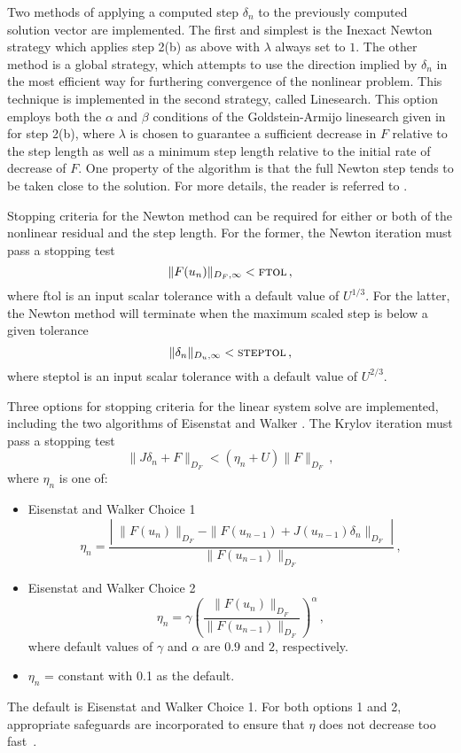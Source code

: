 Two methods of applying a computed step $\delta_n$ to the
previously computed solution vector are implemented. The first and
simplest is the Inexact Newton strategy which applies step 2(b) as
above with $\lambda$ always set to $1$. The other method is a
global strategy, which attempts to use the direction implied by
$\delta_n$ in the most efficient way for furthering convergence of
the nonlinear problem. This technique is implemented in the second
strategy, called Linesearch.  This option employs both the
$\alpha$ and $\beta$ conditions of the Goldstein-Armijo linesearch
given in \cite{DeSc:96} for step 2(b), where $\lambda$ is chosen
to guarantee a sufficient decrease in $F$ relative to the step
length as well as a minimum step length relative to the initial
rate of decrease of $F$.  One property of the algorithm is that
the full Newton step tends to be taken close to the solution.  For
more details, the reader is referred to \cite{DeSc:96}.

Stopping criteria for the Newton method can be required for either
or both of the nonlinear residual and the step length.  For the
former, the Newton iteration must pass a stopping test
\[ \|F(u_n)\|_{D_F,\infty} < \mbox{\sc ftol} \, , \]
where {\sc ftol} is an input scalar tolerance with a default value
of $U^{1/3}$. For the latter, the Newton method will terminate
when the maximum scaled step is below a given tolerance
\[ \|\delta_n\|_{D_u,\infty} < \mbox{\sc steptol} \, , \]
where {\sc steptol} is an input scalar tolerance with a default
value of $U^{2/3}$.

Three options for stopping criteria for the linear system solve
are implemented, including the two algorithms of Eisenstat and
Walker \cite{EiWa:96}. The Krylov iteration must pass a stopping
test
\[ \|J \delta_n + F\|_{D_F} < (\eta_n + U) \|F\|_{D_F} \, , \]
where $\eta_n$ is one of:
\begin{itemize}
\item Eisenstat and Walker Choice 1
  \[
  \eta_n = \frac{\left|\; \|F(u_n)\|_{D_F}
      - \|F(u_{n-1}) + J(u_{n-1}) \delta_n \|_{D_F}
      \; \right|}
  {\|F(u_{n-1})\|_{D_F}} \, ,
  \]
\item Eisenstat and Walker Choice 2
  \[
  \eta_n = \gamma
  \left( \frac{ \|F(u_n)\|_{D_F}}{\|F(u_{n-1})\|_{D_F}} \right)^{\alpha} \, ,
  \]
where default values of $\gamma$ and $\alpha$ are $0.9$ and $2$,
 respectively.
\item  $\eta_n$ = constant with 0.1 as the default.
\end{itemize}
The default is Eisenstat and Walker Choice 1. For both options 1
and 2, appropriate safeguards are incorporated to ensure that
$\eta$ does not decrease too fast~\cite{EiWa:96}.

